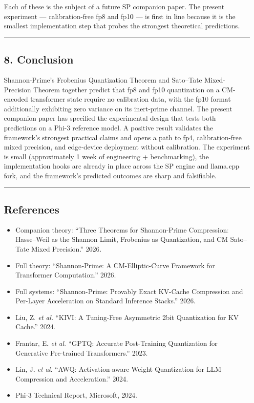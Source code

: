 \documentclass[
  11pt,
]{article}
\providecommand{\tightlist}{%
  \setlength{\itemsep}{0pt}\setlength{\parskip}{0pt}}
\begin{document}
Each of these is the subject of a future SP companion paper. The present
experiment --- calibration-free fp8 and fp10 --- is first in line
because it is the smallest implementation step that probes the strongest
theoretical predictions.

\begin{center}\rule{0.5\linewidth}{0.5pt}\end{center}

\hypertarget{conclusion}{%
\subsection{8. Conclusion}\label{conclusion}}

Shannon-Prime's Frobenius Quantization Theorem and Sato--Tate
Mixed-Precision Theorem together predict that fp8 and fp10 quantization
on a CM-encoded transformer state require no calibration data, with the
fp10 format additionally exhibiting zero variance on its inert-prime
channel. The present companion paper has specified the experimental
design that tests both predictions on a Phi-3 reference model. A
positive result validates the framework's strongest practical claims and
opens a path to fp4, calibration-free mixed precision, and edge-device
deployment without calibration. The experiment is small (approximately 1
week of engineering + benchmarking), the implementation hooks are
already in place across the SP engine and llama.cpp fork, and the
framework's predicted outcomes are sharp and falsifiable.

\begin{center}\rule{0.5\linewidth}{0.5pt}\end{center}

\hypertarget{references}{%
\subsection{References}\label{references}}

\begin{itemize}
\tightlist
\item
  Companion theory: ``Three Theorems for Shannon-Prime Compression:
  Hasse--Weil as the Shannon Limit, Frobenius as Quantization, and CM
  Sato--Tate Mixed Precision.'' 2026.
\item
  Full theory: ``Shannon-Prime: A CM-Elliptic-Curve Framework for
  Transformer Computation.'' 2026.
\item
  Full systems: ``Shannon-Prime: Provably Exact KV-Cache Compression and
  Per-Layer Acceleration on Standard Inference Stacks.'' 2026.
\item
  Liu, Z. \emph{et al.} ``KIVI: A Tuning-Free Asymmetric 2bit
  Quantization for KV Cache.'' 2024.
\item
  Frantar, E. \emph{et al.} ``GPTQ: Accurate Post-Training Quantization
  for Generative Pre-trained Transformers.'' 2023.
\item
  Lin, J. \emph{et al.} ``AWQ: Activation-aware Weight Quantization for
  LLM Compression and Acceleration.'' 2024.
\item
  Phi-3 Technical Report, Microsoft, 2024.
\end{itemize}
\end{document}
